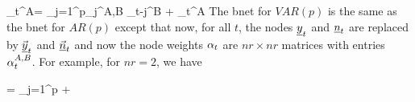 \beq
\rvy_t^A=
\sum_{j=1}^p\alp_j^{A,B}
 \rvy_{t-j}^{B}
+ \rvn_t^A
\label{eq-var-def}
\eeq
The bnet for $VAR(p)$
is the same as the bnet
for  $AR(p)$
except that now,
for all $t$,
the nodes ${\underline{y}}_t$
and ${\underline{n}}_t$
are replaced by
$\vec{{\underline{y}}}_t$
and $\vec{{\underline{n}}}_t$
and now
the node weights $\alpha_t$
are $nr\times nr$
matrices
with entries $\alpha^{A,B}_t$.
For example, for $nr=2$, we have

{\renewcommand{\arraystretch}{1.5}
\beq
{}
=
\sum_{j=1}^p
+
\label{eq-var-2-def}
\eeq
}

